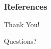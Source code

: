 

\appendix
{}

\begin{frame}
    \frametitle{References}
    \printbibliography
\end{frame}


\begin{frame}

     \begin{center}
        {\Huge Thank You!}
    \end{center}
    
    \bigskip
    
    \begin{center}
            {\LARGE Questions?}
    \end{center}
    
\end{frame}
